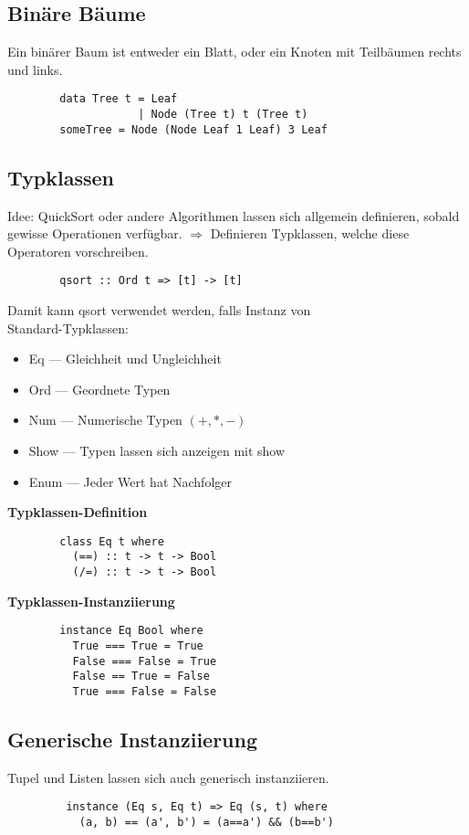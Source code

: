 \subsection{Binäre Bäume}
Ein binärer Baum ist entweder ein Blatt, oder ein Knoten mit Teilbäumen rechts und links.
\begin{lstlisting}
        data Tree t = Leaf
                    | Node (Tree t) t (Tree t)
        someTree = Node (Node Leaf 1 Leaf) 3 Leaf 
\end{lstlisting}

\subsection{Typklassen}
Idee: QuickSort oder andere Algorithmen lassen sich allgemein definieren, sobald gewisse Operationen verfügbar.
\(\Rightarrow\) Definieren Typklassen, welche diese Operatoren vorschreiben.
\begin{lstlisting}
        qsort :: Ord t => [t] -> [t]
\end{lstlisting}
Damit kann qsort verwendet werden, falls  Instanz von \\
Standard-Typklassen:
\begin{itemize}
  \item Eq --- Gleichheit und Ungleichheit
  \item Ord --- Geordnete Typen
  \item Num --- Numerische Typen \((+,*,-)\)
  \item Show --- Typen lassen sich anzeigen mit show
  \item Enum --- Jeder Wert hat Nachfolger
\end{itemize}
\textbf{Typklassen-Definition}
\begin{lstlisting}
        class Eq t where
          (==) :: t -> t -> Bool
          (/=) :: t -> t -> Bool
\end{lstlisting}
\textbf{Typklassen-Instanziierung}
\begin{lstlisting}
        instance Eq Bool where
          True === True = True
          False === False = True
          False == True = False
          True === False = False
\end{lstlisting}
        

\subsection{Generische Instanziierung}
Tupel und Listen lassen sich auch generisch instanziieren.
\begin{lstlisting}
         instance (Eq s, Eq t) => Eq (s, t) where
           (a, b) == (a', b') = (a==a') && (b==b')
\end{lstlisting} 
